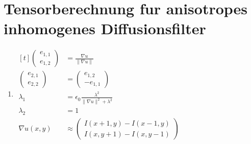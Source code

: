 \section{Tensorberechnung fur anisotropes inhomogenes Diffusionsfilter}
\begin{enumerate}
	\setlength\itemsep{2em}
	\item $\begin{aligned}[t]
			      \begin{pmatrix}
				      e_{1,1} \\
				      e_{1,2}
			      \end{pmatrix} & = \frac{\nabla u}{\| \nabla u \|}                             \\
			      \begin{pmatrix}
				      e_{2,1} \\
				      e_{2,2}
			      \end{pmatrix} & =
			      \begin{pmatrix}
				      e_{1,2} \\
				      -e_{1,1}
			      \end{pmatrix}                                                                \\
			      \lambda_1       & = \epsilon_0 \frac{\lambda^2}{\| \nabla u \|^2 + \lambda^2} \\
			      \lambda_2       & = 1                                                         \\
			      \nabla u (x,y)  & \approx \begin{pmatrix}
				                                I(x+1,y)-I(x-1,y) \\
				                                I(x,y+1)-I(x,y-1)
			                                \end{pmatrix}
		      \end{aligned}$\\


\end{enumerate}
